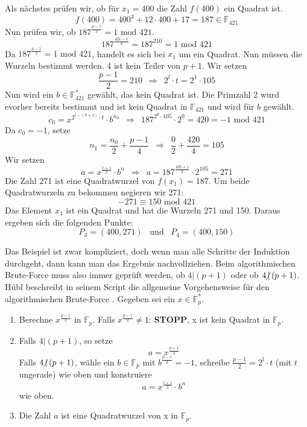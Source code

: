 Als nächstes prüfen wir, ob für $x_1 = 400$ die Zahl $f(400)$ ein Quadrat ist. $$f(400) =  400^{3} + 12 \cdot 400 + 17 = 187 \in \mathbb{F}_{421}$$ Nun prüfen wir, ob $187^{\frac{p - 1}{2}} = 1 \text{ mod } 421$. $$187^{\frac{421 - 1}{2}} = 187^{210} = 1 \text{ mod } 421$$ Da $187^{\frac{p - 1}{2}} = 1 \text{ mod } 421$, handelt es sich bei $x_1$ um ein Quadrat. Nun müssen die Wurzeln bestimmt werden. 4 ist kein Teiler von $p + 1$. Wir setzen $$\frac{p - 1}{2} = 210 \enspace \Longrightarrow \enspace 2^l \cdot t = 2^1 \cdot 105$$ Nun wird ein $b \in \mathbb{F}_{421}^*$ gewählt, das kein Quadrat ist. Die Primzahl 2 wurd evorher bereits bestimmt und ist kein Quadrat in $\mathbb{F}_{421}$ und wird für $b$ gewählt. $$c_0 = x^{2^{l - (0 + 1)} \cdot t} \cdot b^{n_0} \enspace \Longrightarrow \enspace 187^{2^{0} \cdot 105} \cdot 2^0 = 420 = - 1 \text{ mod } 421$$ Da $c_0 = - 1$, setze $$n_{1} = \frac{n_0}{2} + \frac{p - 1}{4} \enspace \Longrightarrow \enspace \frac{0}{2} + \frac{420}{4} = 105$$ Wir setzen $$a = x^{\frac{t + 1}{2}} \cdot b^n  \enspace \Longrightarrow \enspace a = 187^{\frac{105 + 1}{2}} \cdot 2^{105} = 271$$ Die Zahl 271 ist eine Quadratwurzel von $f(x_1) = 187$. Um beide Quadratwurzeln zu bekommen negieren wir 271: $$- 271 \equiv 150 \text{ mod } 421$$ Das Element $x_1$ ist ein Quadrat und hat die Wurzeln 271 und 150. Daraus ergeben sich die folgenden Punkte: $$P_3 = (400, 271) \enspace \text{ und } \enspace P_4 = (400, 150)$$

Das Beispiel ist zwar kompliziert, doch wenn man alle Schritte der Induktion durchgeht, dann kann man das Ergebnis nachvollziehen. Beim algorithmischen Brute-Force muss also immer geprüft werden, ob $4 | (p + 1)$ oder ob $4 \hspace{-0.4em}\not\hspace{0.025em}|\, (p + 1)$. Hübl beschreibt in seinem Script die allgemeine Vorgehensweise für den algorithmischen Brute-Force \cite[S. 271-272]{Dr.ReinholdHubl.2022}. Gegeben sei ein $x \in \mathbb{F}_p^*$.

\begin{enumerate}
\item Berechne $x^{\frac{p - 1}{2}}$ in $\mathbb{F}_p$. Falls $x^{\frac{p - 1}{2}} \neq 1$: \textbf{STOPP}, x ist kein Quadrat in $\mathbb{F}_p$.
\item Falls $4 | (p + 1)$, so setze $$a =  x^{\frac{p + 1}{4}}$$ Falls $4 \hspace{-0.4em}\not\hspace{0.025em}|\, (p + 1)$, wähle ein $b \in \mathbb{F}_p$ mit $b^{\frac{p - 1}{2}} = -1$, schreibe $\frac{p - 1}{2} = 2^l \cdot t$ (mit $t$ ungerade) wie oben und konstruiere $$a =  x^{\frac{t + 1}{2}} \cdot b^n$$ wie oben.
\item Die Zahl $a$ ist eine Quadratwurzel von x in $\mathbb{F}_p$.
\end{enumerate}


